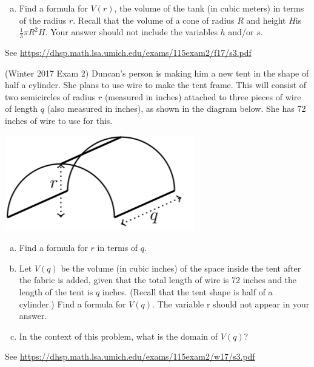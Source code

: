 \documentclass[11pt]{exam}
\begin{document}
\begin{questions}
\begin{enumerate}[(a)]
\item Find a formula for $V(r)$, the volume of the tank (in cubic meters) in terms of the radius $r$. Recall that the volume of a cone of radius $R$ and height $H$is $\frac{1}{3} \pi R^2 H$. Your answer should not include the variables $h$ and/or $s$.
\end{enumerate}
\begin{solution}
  See \href{https://dhsp.math.lsa.umich.edu/exams/115exam2/f17/s3.pdf}{https://dhsp.math.lsa.umich.edu/exams/115exam2/f17/s3.pdf}
\end{solution}
\vspace{0.75in}
\question (Winter 2017 Exam 2) %
  Duncan’s person is making him a new tent in the shape of half a cylinder. She plans to use wire to make the tent frame. This will consist of two semicircles of radius $r$ (measured in inches) attached to three pieces of wire of length $q$ (also measured in inches), as shown in the diagram below. She has 72 inches of wire to use for this.
  \begin{center}
    \includegraphics[scale=0.4]{Figures/Duncan.png}
  \end{center}
\begin{enumerate}[(a)]
\item Find a formula for $r$ in terms of $q$.
\item Let $V (q)$ be the volume (in cubic inches) of the space inside the tent after the fabric is added, given that the total length of wire is 72 inches and the length of the tent is $q$ inches. (Recall that the tent shape is half of a cylinder.) Find a formula for $V (q)$. The variable r should not appear in your answer.
\item In the context of this problem, what is the domain of $V (q)$?
\end{enumerate}
\begin{solution}
 See \href{https://dhsp.math.lsa.umich.edu/exams/115exam2/w17/s3.pdf}{https://dhsp.math.lsa.umich.edu/exams/115exam2/w17/s3.pdf}
\end{solution}
\end{questions}
\end{document}
